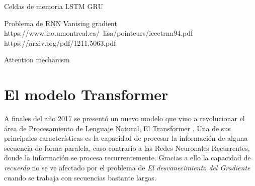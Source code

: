 Celdas de memoria LSTM GRU



Problema de RNN
Vanising gradient
https://www.iro.umontreal.ca/~lisa/pointeurs/ieeetrnn94.pdf
https://arxiv.org/pdf/1211.5063.pdf


Attention mechanism



\section{El modelo Transformer}

A finales del año 2017 se presentó un nuevo modelo que vino a revolucionar el área de Procesamiento
de Lenguaje Natural, El Transformer \cite{Vaswani}. Una de sus principales características es la
capacidad de procesar la información de alguna secuencia de forma paralela, caso contrario a las
Redes Neuronales Recurrentes, donde la información se procesa recurrentemente. Gracias a ello
la capacidad de \textit{recuerdo} no se ve afectado por el problema de \textit{El
desvanecimiento del Gradiente} cuando se trabaja con secuencias bastante largas.

